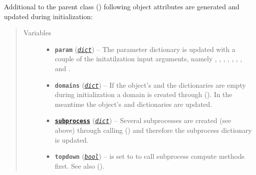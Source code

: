 \documentclass[a4paper,10pt,english]{sphinxmanual}
\begin{document}
\begin{fulllineitems}
Additional to the parent class {\hyperref[api/climlab.process:climlab.process.energy_budget.EnergyBudget]{\emph{}}} ()
following object attributes are generated and updated during initialization:
\begin{quote}\begin{description}
\item[{Variables}] \leavevmode\begin{itemize}
\item {} 
\textbf{\texttt{param}} (\href{http://docs.python.org/2.7/library/stdtypes.html\#dict}{\emph{\texttt{dict}}}) -- The parameter dictionary is updated with a couple 
of the initatilzation input arguments, namely
, , , , , 
, ,  and .

\item {} 
\textbf{\texttt{domains}} (\href{http://docs.python.org/2.7/library/stdtypes.html\#dict}{\emph{\texttt{dict}}}) -- If the object's  and the  
dictionaries are empty during initialization 
a domain  is created through 
{\hyperref[api/climlab.domain:climlab.domain.domain.zonal_mean_surface]{\emph{}}} ().
In the meantime the object's  and 
 dictionaries are updated.

\item {} 
\href{http://docs.python.org/2.7/library/subprocess.html\#module-subprocess}{\textbf{\texttt{subprocess}}} (\href{http://docs.python.org/2.7/library/stdtypes.html\#dict}{\emph{\texttt{dict}}}) -- Several subprocesses are created (see above) 
through calling 
{\hyperref[api/climlab.process:climlab.process.process.Process.add_subprocess]{\emph{}}} ()
and therefore the subprocess dictionary is updated.

\item {} 
\textbf{\texttt{topdown}} (\href{http://docs.python.org/2.7/library/functions.html\#bool}{\emph{\texttt{bool}}}) -- is set to  to call subprocess compute 
methods first.
See also 
{\hyperref[api/climlab.process:climlab.process.time_dependent_process.TimeDependentProcess]{\emph{}}} ().


\end{itemize}
\end{description}
\end{quote}
\end{fulllineitems}
\end{document}
